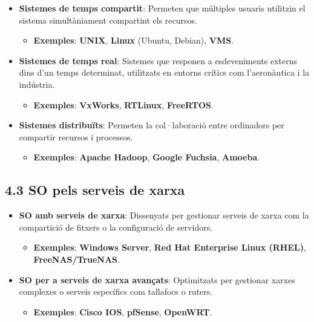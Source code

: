 \documentclass[
  a4paper,
]{article}
\providecommand{\tightlist}{%
  \setlength{\itemsep}{0pt}\setlength{\parskip}{0pt}}
\begin{document}
\begin{itemize}
\tightlist
\item
  \textbf{Sistemes de temps compartit}: Permeten que múltiples usuaris
  utilitzin el sistema simultàniament compartint els recursos.

  \begin{itemize}
  \tightlist
  \item
    \textbf{Exemples}: \textbf{UNIX}, \textbf{Linux} (Ubuntu, Debian),
    \textbf{VMS}.
  \end{itemize}
\item
  \textbf{Sistemes de temps real}: Sistemes que responen a esdeveniments
  externs dins d'un temps determinat, utilitzats en entorns crítics com
  l'aeronàutica i la indústria.

  \begin{itemize}
  \tightlist
  \item
    \textbf{Exemples}: \textbf{VxWorks}, \textbf{RTLinux},
    \textbf{FreeRTOS}.
  \end{itemize}
\item
  \textbf{Sistemes distribuïts}: Permeten la col·laboració entre
  ordinadors per compartir recursos i processos.

  \begin{itemize}
  \tightlist
  \item
    \textbf{Exemples}: \textbf{Apache Hadoop}, \textbf{Google Fuchsia},
    \textbf{Amoeba}.
  \end{itemize}
\end{itemize}

\subsection{4.3 SO pels serveis de
xarxa}\label{so-pels-serveis-de-xarxa}

\begin{itemize}
\tightlist
\item
  \textbf{SO amb serveis de xarxa}: Dissenyats per gestionar serveis de
  xarxa com la compartició de fitxers o la configuració de servidors.

  \begin{itemize}
  \tightlist
  \item
    \textbf{Exemples}: \textbf{Windows Server}, \textbf{Red Hat
    Enterprise Linux (RHEL)}, \textbf{FreeNAS/TrueNAS}.
  \end{itemize}
\item
  \textbf{SO per a serveis de xarxa avançats}: Optimitzats per gestionar
  xarxes complexes o serveis específics com tallafocs o ruters.

  \begin{itemize}
  \tightlist
  \item
    \textbf{Exemples}: \textbf{Cisco IOS}, \textbf{pfSense},
    \textbf{OpenWRT}.
  \end{itemize}
\end{itemize}
\end{document}
